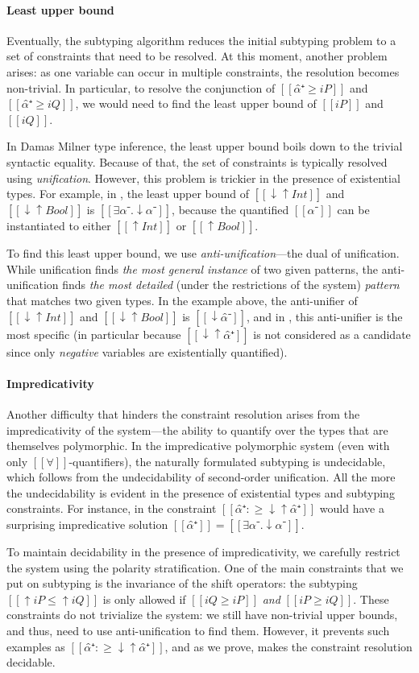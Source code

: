 \paragraph*{Least upper bound}
Eventually, the subtyping algorithm reduces the initial subtyping problem to a set of
constraints that need to be resolved. At this moment, another problem arises:
as one variable can occur in multiple constraints, the resolution becomes non-trivial.
In particular, to resolve the conjunction of $[[α̂⁺ ≥ iP]]$ and $[[α̂⁺ ≥ iQ]]$,
we would need to find the least upper bound of $[[iP]]$ and $[[iQ]]$.

In Damas Milner type inference, the least upper bound boils down to the trivial syntactic equality.
Because of that, the set of constraints is typically resolved using \emph{unification}.
However, this problem is trickier in the presence of existential types. For example, 
in \fexists, the least upper bound of $[[↓↑Int]]$ and $[[↓↑Bool]]$ is $[[∃α⁻.↓α⁻]]$,
because the quantified $[[α⁻]]$ can be instantiated to either $[[↑Int]]$ or $[[↑Bool]]$.

To find this least upper bound, we use \emph{anti-unification}---the dual of
unification. While unification finds \emph{the most general instance} of two
given patterns, the anti-unification finds \emph{the most detailed} (under the
restrictions of the system) \emph{pattern} that matches two given types. In the
example above, the anti-unifier of $[[↓↑Int]]$ and $[[↓↑Bool]]$ is $[[↓α̂⁻]]$,
and in \fexists, this anti-unifier is the most specific (in particular because
$[[↓↑α̂⁺]]$ is not considered as a candidate since only \emph{negative} variables are
existentially quantified).

\paragraph*{Impredicativity}
Another difficulty that hinders the constraint resolution arises from the
impredicativity of the system---the ability to quantify over the types that are 
themselves polymorphic. In the impredicative polymorphic system (even
with only $[[∀]]$-quantifiers), the naturally formulated subtyping is
undecidable, which follows from the undecidability of second-order unification.
All the more the undecidability is evident in the presence of existential types
and subtyping constraints. For instance, in \fexists the constraint 
$[[α̂⁺ :≥ ↓↑α̂⁺]]$ would have a surprising impredicative solution $[[α̂⁺]] = [[∃α⁻.↓α⁻]]$. 

To maintain decidability in the presence of impredicativity, we carefully
restrict the system using the polarity stratification. One of the main
constraints that we put on subtyping is the invariance of the shift operators:
the subtyping $[[↑iP ≤ ↑iQ]]$ is only allowed if $[[iQ ≥ iP]]$
\emph{and} $[[iP ≥ iQ]]$. These constraints do not trivialize the system: we
still have non-trivial upper bounds, and thus, need to use anti-unification to
find them. However, it prevents such examples as $[[α̂⁺ :≥ ↓↑α̂⁺]]$, and 
as we prove, makes the constraint resolution decidable.

